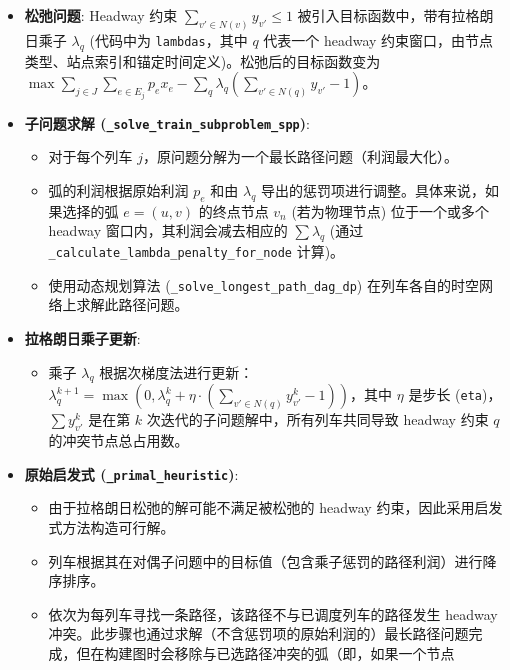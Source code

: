 \documentclass{article}
\begin{document}
\begin{itemize}
    \item \textbf{松弛问题}: Headway 约束 $\sum_{v' \in N(v)} y_{v'} \le 1$
        被引入目标函数中，带有拉格朗日乘子 $\lambda_q$
        (代码中为 \texttt{lambdas}，其中 $q$ 代表一个 headway
        约束窗口，由节点类型、站点索引和锚定时间定义)。松弛后的目标函数变为 $\max
        \sum_{j \in J} \sum_{e \in E_j} p_e x_e - \sum_q \lambda_q
        (\sum_{v' \in N(q)} y_{v'} - 1)$。
    \item \textbf{子问题求解 (\texttt{\_solve\_train\_subproblem\_spp})}:
        \begin{itemize}
            \item 对于每个列车 $j$，原问题分解为一个最长路径问题（利润最大化）。
            \item 弧的利润根据原始利润 $p_e$ 和由 $\lambda_q$
                导出的惩罚项进行调整。具体来说，如果选择的弧 $e=(u,v)$ 的终点节点 $v_n$ (若为物理节点)
                位于一个或多个 headway 窗口内，其利润会减去相应的 $\sum \lambda_q$ (通过
                \texttt{\_calculate\_lambda\_penalty\_for\_node} 计算)。
            \item 使用动态规划算法 (\texttt{\_solve\_longest\_path\_dag\_dp})
                在列车各自的时空网络上求解此路径问题。
        \end{itemize}
    \item \textbf{拉格朗日乘子更新}:
        \begin{itemize}
            \item 乘子 $\lambda_q$ 根据次梯度法进行更新： $\lambda_q^{k+1} =
                \max(0, \lambda_q^k + \eta \cdot (\sum_{v' \in N(q)}
                y_{v'}^{k} - 1))$，其中 $\eta$ 是步长 (\texttt{eta})，$\sum
                y_{v'}^{k}$ 是在第 $k$ 次迭代的子问题解中，所有列车共同导致 headway 约束 $q$
                的冲突节点总占用数。
        \end{itemize}
    \item \textbf{原始启发式 (\texttt{\_primal\_heuristic})}:
        \begin{itemize}
            \item 由于拉格朗日松弛的解可能不满足被松弛的 headway 约束，因此采用启发式方法构造可行解。
            \item 列车根据其在对偶子问题中的目标值（包含乘子惩罚的路径利润）进行降序排序。
            \item 依次为每列车寻找一条路径，该路径不与已调度列车的路径发生 headway
                冲突。此步骤也通过求解（不含惩罚项的原始利润的）最长路径问题完成，但在构建图时会移除与已选路径冲突的弧（即，如果一个节点

\end{itemize}
\end{itemize}
\end{document}
